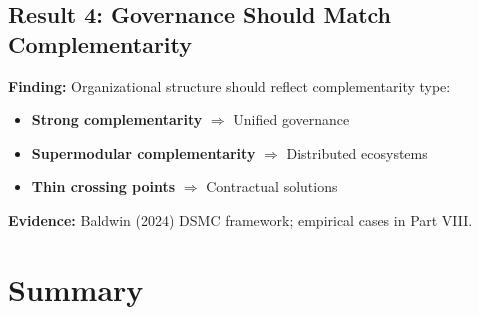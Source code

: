 \subsection{Result 4: Governance Should Match Complementarity}

\begin{tcolorbox}[colback=green!5!white, colframe=green!75!black]
\textbf{Finding:} Organizational structure should reflect complementarity type:
\begin{itemize}[nosep]
    \item \textbf{Strong complementarity} $\Rightarrow$ Unified governance
    \item \textbf{Supermodular complementarity} $\Rightarrow$ Distributed ecosystems
    \item \textbf{Thin crossing points} $\Rightarrow$ Contractual solutions
\end{itemize}

\textbf{Evidence:} Baldwin (2024) DSMC framework; empirical cases in Part VIII.
\end{tcolorbox}



\section{Summary}
\label{sec:B-summary}


